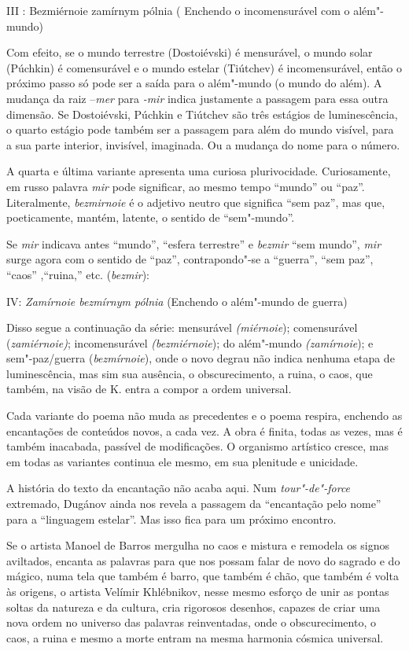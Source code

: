 III : Bezmiérnoie zamírnym pólnia ( Enchendo o incomensurável com o
além"-mundo)

Com efeito, se o mundo terrestre (Dostoiévski) é mensurável, o mundo
solar (Púchkin) é comensurável e o mundo estelar (Tiútchev) é
incomensurável, então o próximo passo só pode ser a saída para o
além"-mundo (o mundo do além). A mudança da raiz --\emph{mer} para
\emph{-mir} indica justamente a passagem para essa outra dimensão. Se
Dostoiévski, Púchkin e Tiútchev são três estágios de luminescência, o
quarto estágio pode também ser a passagem para além do mundo visível,
para a sua parte interior, invisível, imaginada. Ou a mudança do nome
para o número.

A quarta e última variante apresenta uma curiosa plurivocidade.
Curiosamente, em russo palavra \emph{mir} pode significar, ao mesmo
tempo ``mundo'' ou ``paz''. Literalmente, \emph{bezmirnoie} é o adjetivo
neutro que significa ``sem paz'', mas que, poeticamente, mantém,
latente, o sentido de ``sem"-mundo''.

Se \emph{mir} indicava antes ``mundo'', ``esfera terrestre'' e
\emph{bezmir} ``sem mundo'', \emph{mir} surge agora com o sentido de
``paz'', contrapondo"-se a ``guerra'', ``sem paz'', ``caos'' ,``ruina,''
etc. (\emph{bezmir}):

IV: \emph{Zamírnoie bezmírnym pólnia} (Enchendo o além"-mundo de guerra)

Disso segue a continuação da série: mensurável \emph{(miérnoie});
comensurável (\emph{zamiérnoie)}; incomensurável \emph{(bezmiérnoie});
do além"-mundo \emph{(zamírnoie}); e sem"-paz/guerra (\emph{bezmírnoie}),
onde o novo degrau não indica nenhuma etapa de luminescência, mas sim
sua ausência, o obscurecimento, a ruina, o caos, que também, na visão de
K. entra a compor a ordem universal.

Cada variante do poema não muda as precedentes e o poema respira,
enchendo as encantações de conteúdos novos, a cada vez. A obra é finita,
todas as vezes, mas é também inacabada, passível de modificações. O
organismo artístico cresce, mas em todas as variantes continua ele
mesmo, em sua plenitude e unicidade.

A história do texto da encantação não acaba aqui. Num
\emph{tour"-de"-force} extremado, Dugánov ainda nos revela a passagem da
``encantação pelo nome'' para a ``linguagem estelar''. Mas isso fica
para um próximo encontro.

Se o artista Manoel de Barros mergulha no caos e mistura e remodela os
signos aviltados, encanta as palavras para que nos possam falar de novo
do sagrado e do mágico, numa tela que também é barro, que também é chão,
que também é volta às origens, o artista Velímir Khlébnikov, nesse mesmo
esforço de unir as pontas soltas da natureza e da cultura, cria
rigorosos desenhos, capazes de criar uma nova ordem no universo das
palavras reinventadas, onde o obscurecimento, o caos, a ruina e mesmo a
morte entram na mesma harmonia cósmica universal.

